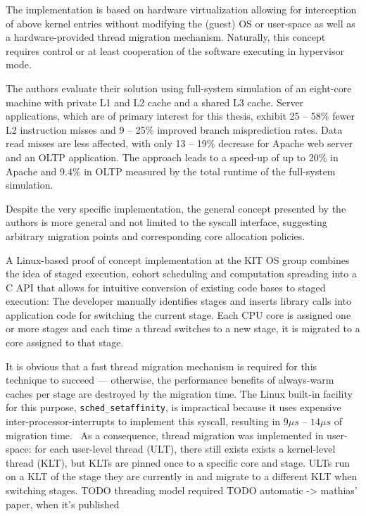 \documentclass[12pt,a4paper]{book}
\begin{document}
The implementation is based on hardware virtualization allowing for interception of above kernel entries without modifying the (guest) OS or user-space as well as a hardware-provided thread migration mechanism.
Naturally, this concept requires control or at least cooperation of the software executing in hypervisor mode.

The authors evaluate their solution using full-system simulation of an eight-core machine with private L1 and L2 cache and a shared L3 cache.
Server applications, which are of primary interest for this thesis, exhibit 25 -- 58\% fewer L2 instruction misses and 9 -- 25\% improved branch misprediction rates.
Data read misses are less affected, with only 13 -- 19\% decrease for Apache web server and an OLTP application.
The approach leads to a speed-up of up to 20\% in Apache and 9.4\% in OLTP measured by the total runtime of the full-system simulation.

Despite the very specific implementation, the general concept presented by the authors is more general and not limited to the syscall interface, suggesting arbitrary migration points and corresponding core allocation policies.

A Linux-based proof of concept implementation at the KIT OS group combines the idea of staged execution, cohort
scheduling and computation spreading into a C API that allows for intuitive conversion of existing code bases to
staged execution:
The developer manually identifies stages and inserts library calls into application code for switching the current stage.
Each CPU core is assigned one or more stages and each time a thread switches to a new stage, it is migrated to a core
assigned to that stage.

It is obvious that a fast thread migration mechanism is required for this technique to succeed
--- otherwise, the performance benefits of always-warm caches per stage are destroyed by the migration time.
The Linux built-in facility for this purpose, \texttt{sched\_setaffinity}, is impractical because it uses
expensive inter-processor-interrupts to implement this syscall, resulting in $9\mu s$ -- $14\mu s$ of migration time.~\cite{sodaspr}%
As a consequence, thread migration was implemented in user-space:
for each user-level thread (ULT), there still exists exists a kernel-level thread (KLT),
but KLTs are pinned once to a specific core and stage.
ULTs run on a KLT of the stage they are currently in and migrate to a different KLT when switching stages.
TODO threading model required
TODO automatic -> mathias' paper, when it's published
\end{document}
